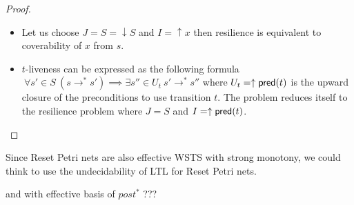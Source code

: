 \begin{proof}

\begin{itemize}
\item Let us choose $J=S= \downarrow S$ and $I=\uparrow x$ then resilience is equivalent to coverability of $x$ from $s$.

\item $t$-liveness  can be expressed as the following formula
$ ~ \forall s' \in S ~ (s \rightarrow^* s') \implies \exists s'' \in U_t ~ s' \rightarrow^{*} s''$ 
where
$U_t=\uparrow \textsf{pred}(t)$
is the upward closure of the preconditions to use transition $t$.  
The problem reduces itself to the resilience problem
where $J=S$ and $I = \uparrow \textsf{pred}(t)$.

\end{itemize}

\end{proof}

Since Reset Petri nets are also effective WSTS with strong monotony, we could think to use the undecidability of LTL for Reset Petri nets.

and with effective basis of $post^*$ ???







